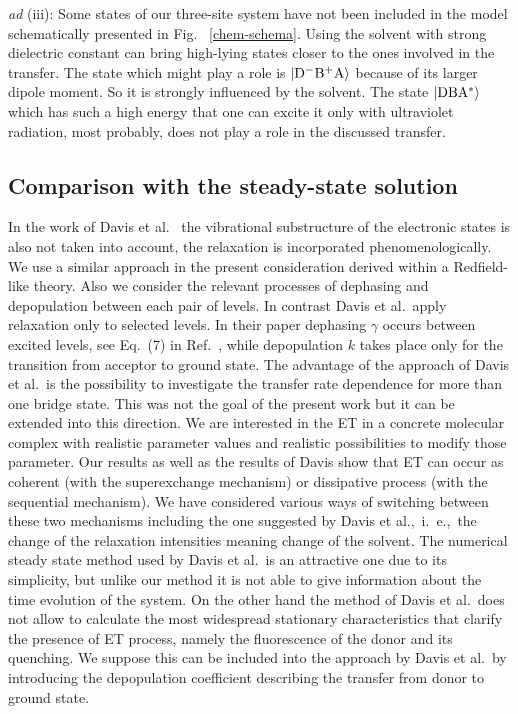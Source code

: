 \documentclass[12pt,twoside,a4paper]{report}
\begin{document}
{\it ad} (iii):
Some states of our three-site system have not been included 
in the
model 
schematically presented 
in 
Fig.~
\ref{chem-schema}.  
Using
the solvent with strong dielectric constant can
bring high-lying states closer to the ones involved in the transfer.  
The state which might play a role 
is $\left| {\rm D^-B^+A} \right>$ because of its larger dipole moment.
So it is strongly influenced by the solvent.
The state $\left| {\rm DBA^*} \right>$ which has such a high energy
that one
can excite it only with ultraviolet radiation, most probably, does not
play a role in the discussed transfer.  


 



\subsection{Comparison with the steady-state solution\label{chem-Davis}}
In the work of Davis et al.\ \cite{d2} the vibrational substructure of
the electronic states is also not taken into account, the relaxation is
incorporated phenomenologically.  We use a similar approach in the
present consideration derived within a Redfield-like theory.  Also
we consider the relevant processes of dephasing and depopulation
between each pair of levels. In contrast Davis et al.\ apply
relaxation only to selected levels. In their paper dephasing $\gamma$ occurs
between excited levels, see Eq.~(7) in Ref.~\cite{d2}, while depopulation $k$ takes place only for the
transition from acceptor to ground state. The advantage of the
approach of Davis et al.\ is the possibility to investigate the
transfer rate dependence for more than one bridge state. This was not
the goal of the present work but it can be extended into this
direction.  We are interested in the ET in a concrete
molecular complex with realistic parameter values and realistic
possibilities to modify those parameter. 
Our results as well
as the results of Davis show that ET can occur as
coherent (with the superexchange mechanism) or dissipative process
(with the sequential mechanism). We have considered various ways of
switching between these two mechanisms
including the one suggested by  Davis et al.,\
i.~e.,\ the change
of the relaxation intensities meaning change of the solvent. The numerical
steady state method used by Davis et al.\ is an attractive one due to
its simplicity, but unlike our method it is not able to give
information about the time evolution of the system.  On the other hand
the method of Davis et al.\ does not allow to calculate the most
widespread stationary characteristics that clarify the presence of
ET process, namely the fluorescence of the donor and
its quenching.  We suppose this can be included into the approach by
Davis et al.\ by introducing the depopulation coefficient describing
the transfer from donor to ground state.
\end{document}
